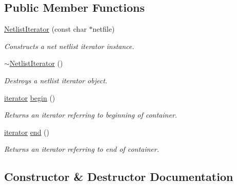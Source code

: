 \subsection*{Public Member Functions}
\begin{DoxyCompactItemize}
\item 
\hyperlink{class_netlist_iterator_afd108a0b85b96f1b2e65623169d996ef}{Netlist\+Iterator} (const char $\ast$netfile)
\begin{DoxyCompactList}\small\item\em Constructs a net netlist iterator instance. \end{DoxyCompactList}\item 
\mbox{\label{class_netlist_iterator_ad1519bc0f9dcf7d062b26f4398d05258}} 
\hyperlink{class_netlist_iterator_ad1519bc0f9dcf7d062b26f4398d05258}{$\sim$\+Netlist\+Iterator} ()
\begin{DoxyCompactList}\small\item\em Destroys a netlist iterator object. \end{DoxyCompactList}\item 
\mbox{\label{class_netlist_iterator_ade6591784a201d8871e1371824486366}} 
\hyperlink{class_netlist_iterator_a01a89af59a5e9cad282a42d1843b3995}{iterator} \hyperlink{class_netlist_iterator_ade6591784a201d8871e1371824486366}{begin} ()
\begin{DoxyCompactList}\small\item\em Returns an iterator referring to beginning of container. \end{DoxyCompactList}\item 
\mbox{\label{class_netlist_iterator_ac0e8d12f94eb538878cf0a1cdf055438}} 
\hyperlink{class_netlist_iterator_a01a89af59a5e9cad282a42d1843b3995}{iterator} \hyperlink{class_netlist_iterator_ac0e8d12f94eb538878cf0a1cdf055438}{end} ()
\begin{DoxyCompactList}\small\item\em Returns an iterator referring to end of container. \end{DoxyCompactList}\end{DoxyCompactItemize}


\subsection{Constructor \& Destructor Documentation}
\mbox{\label{class_netlist_iterator_afd108a0b85b96f1b2e65623169d996ef}} 
